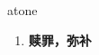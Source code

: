
\begin{frame}
{\huge atone}
\begin{center}
\begin{enumerate}\Large
  \item \textbf{赎罪，弥补}
\end{enumerate}
\end{center}
\end{frame}

